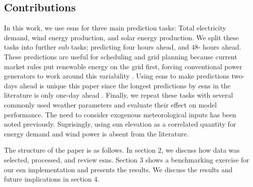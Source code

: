 \subsection{Contributions}
In this work, we use \glspl{esn} for three main prediction tasks: Total
electricity demand, wind energy production, and solar energy production. We
split these tasks into further sub tasks; predicting four hours ahead, and 48-
hours ahead. These predictions are useful for scheduling and grid planning
because current market rules put renewable energy on the grid first, forcing
conventional power generators to work around this variability
\cite{wang_quantifying_2016}. Using \glspl{esn} to make predictions two-days
ahead is unique this paper since the longest predictions by \glspl{esn} in the
literature is only one-day ahead \cite{deihimi_application_2012}. Finally, we
repeat these tasks with several commonly used weather parameters and evaluate
their effect on model performance. The need to consider exogenous meteorological
inputs has been noted previously. Suprisingly, using sun elevation as a
correlated quantity for energy demand and wind power is absent from the
literature.

The structure of the paper is as follows. In section 2, we discuss how data
was selected, processed, and review \glspl{esn}. Section 3 shows a benchmarking
exercise for our \gls{esn} implementation and presents the results. We discuss
the results and future implications in section 4.
